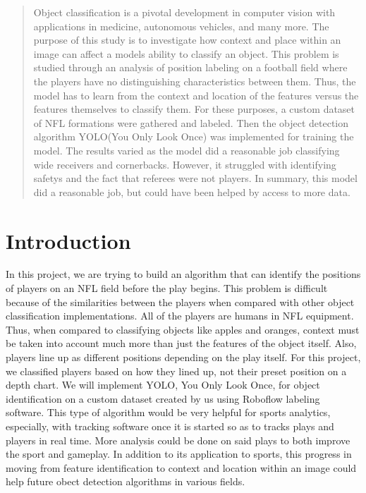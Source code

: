 \author{
    \emph{The Playmakers}: John Michael Slezak, Atif Khan, Chenhao Lu, Ruida Zeng.\\
    \emph{TA name:} Joel Manasseh.
    Brown University\\
}

\maketitle

\begin{abstract}
Object classification is a pivotal development in computer vision with applications in medicine, autonomous vehicles, and many more. The purpose of this study is to investigate how context and place within an image can affect a models ability to classify an object. This problem is studied through an analysis of position labeling on a football field where the players have no distinguishing characteristics between them. Thus, the model has to learn from the context and location of the features versus the features themselves to classify them. For these purposes, a custom dataset of NFL formations were gathered and labeled. Then the object detection algorithm YOLO(You Only Look Once) was implemented for training the model. The results varied as the model did a reasonable job classifying wide receivers and cornerbacks. However, it struggled with identifying safetys and the fact that referees were not players. In summary, this model did a reasonable job, but could have been helped by access to more data. 
\end{abstract}


\section{Introduction}


In this project, we are trying to build an algorithm that can identify the positions of players on an NFL field before the play begins. This problem is difficult because of the similarities between the players when compared with other object classification implementations. All of the players are humans in NFL equipment. Thus, when compared to classifying objects like apples and oranges, context must be taken into account much more than just the features of the object itself. Also, players line up as different positions depending on the play itself. For this project, we classified players based on how they lined up, not their preset position on a depth chart. 
We will implement YOLO, You Only Look Once, for object identification on a custom dataset created by us using Roboflow labeling software. This type of algorithm would be very helpful for sports analytics, especially, with tracking software once it is started so as to tracks plays and players in real time. More analysis could be done on said plays to both improve the sport and gameplay. In addition to its application to sports, this progress in moving from feature identification to context and location within an image could help future obect detection algorithms in various fields.

